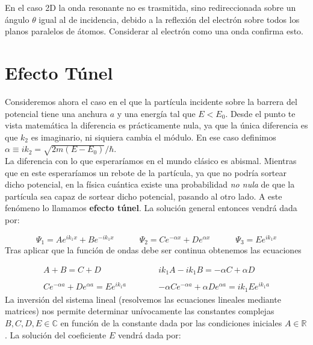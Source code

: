 \documentclass[12pt]{article}
\newcommand{\tquad}{\quad \quad \quad}
\begin{document}
En el caso 2D la onda resonante no es trasmitida, sino redireccionada sobre un ángulo $\theta$ igual al de incidencia, debido a la reflexión del electrón sobre todos los planos paralelos de átomos. Considerar al electrón como una onda confirma esto.


\section{Efecto Túnel}

Consideremos ahora el caso en el que la partícula incidente sobre la barrera del potencial tiene una anchura $a$ y una energía tal que $E<E_0$. Desde el punto te vista matemática la diferencia es prácticamente nula, ya que la única diferencia es que $k_2$ es imaginario, ni siquiera cambia el módulo. En ese caso definimos $\alpha \equiv ik_2 = \sqrt{2m(E-E_0)}/\hbar$. \\

La diferencia con lo que esperaríamos en el mundo clásico es abismal. Mientras que en este esperaríamos un rebote de la partícula, ya que no podría sortear dicho potencial, en la física cuántica existe una probabilidad \textit{no nula} de que la partícula sea capaz de sortear dicho potencial, pasando al otro lado. A este fenómeno lo llamamos \textbf{efecto túnel}. La solución general entonces vendrá dada por: 

\begin{equation}
\Psi_1 = A e^{ik_1x} +  B e^{-ik_1x}  \tquad
\Psi_2 = C e^{-\alpha x} +  D e^{\alpha x}  \tquad
\Psi_3 = E e^{ik_1x} 
\end{equation}
Tras aplicar que la función de ondas debe ser continua obtenemos las ecuaciones


\begin{equation}
\begin{array}{cc} 
A + B = C + D \tquad & ik_1 A - i k_1 B =- \alpha C+ \alpha D \\ \\
C e^{-\alpha a} + D e^{\alpha a} = E e^{ik_1a} \tquad & - \alpha C e^{-\alpha a}  +\alpha D e^{\alpha a}  = i k_1 E  e^{ik_1a} 
\end{array}
\end{equation}
La inversión del sistema lineal (resolvemos las ecuaciones lineales mediante matrices) nos permite determinar unívocamente las constantes complejas $B,C,D,E \in  \mathbb{C}$ en función de la constante dada por las condiciones iniciales $A \in \mathbb{R}$. La solución del coeficiente $E$ vendrá dada por:
\end{document}
